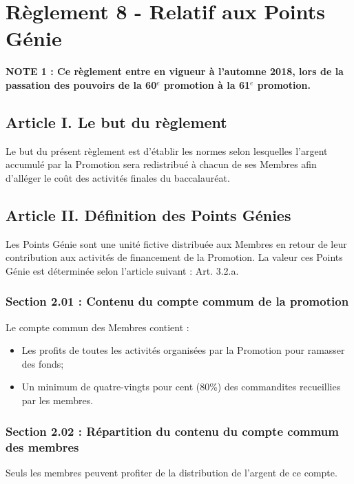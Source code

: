 
\section*{Règlement 8 - Relatif aux Points Génie} 

\textbf{NOTE 1 : Ce règlement entre en vigueur à l'automne 2018, lors de la passation des pouvoirs de la 60$^e$ promotion à la 61$^e$ promotion.}

\subsection*{Article I. Le but du règlement}
Le but du présent règlement est d'établir les normes selon lesquelles l'argent accumulé par la Promotion sera redistribué à chacun de ses Membres afin d’alléger le coût des activités finales du baccalauréat.

\subsection*{Article II. Définition des Points Génies}
Les Points Génie sont une unité fictive distribuée aux Membres en retour de leur contribution aux activités de financement de la Promotion. La valeur ces Points Génie est déterminée selon l’article suivant : Art. 3.2.a.

\subsubsection*{Section 2.01 : Contenu du compte commum de la promotion}
Le compte commun des Membres contient :
\begin{itemize}
\item Les profits de toutes les activités organisées par la Promotion pour ramasser des fonds;
\item Un minimum de quatre-vingts pour cent (80\%) des commandites recueillies par les membres.
\end{itemize}

\subsubsection*{Section 2.02 : Répartition du contenu du compte commum des membres}
Seuls les membres peuvent profiter de la distribution de l’argent de ce compte.

